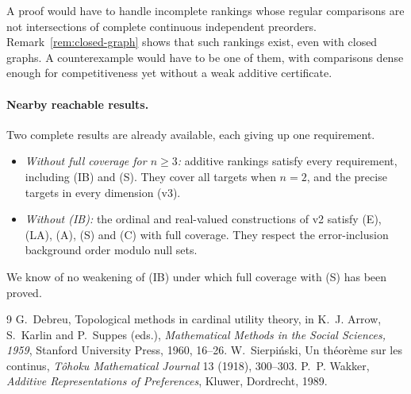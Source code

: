 \documentclass[11pt]{article}
\theoremstyle{remark}\newtheorem{remark}[theorem]{Remark}
\begin{document}
A proof would have to handle incomplete rankings whose regular comparisons
are not intersections of complete continuous independent preorders.
Remark~\ref{rem:closed-graph} shows that such rankings exist, even with closed
graphs. A counterexample would have to be one of them, with comparisons dense
enough for competitiveness yet without a weak additive certificate.

\paragraph{Nearby reachable results.} Two complete results are already
available, each giving up one requirement.
\begin{itemize}[leftmargin=*,itemsep=2pt]
\item \emph{Without full coverage for $n\ge3$:} additive rankings satisfy every
requirement, including (IB) and (S). They cover all targets when $n=2$, and
the precise targets in every dimension (v3).
\item \emph{Without (IB):} the ordinal and real-valued constructions of v2
satisfy (E), (LA), (A), (S) and (C) with full coverage. They respect the
error-inclusion background order modulo null sets.
\end{itemize}
We know of no weakening of (IB) under which full coverage with (S) has been
proved.

\begin{thebibliography}{9}
 G.~Debreu, Topological methods in cardinal utility theory,
in K.~J. Arrow, S.~Karlin and P.~Suppes (eds.), \emph{Mathematical Methods in
the Social Sciences, 1959}, Stanford University Press, 1960, 16--26.
 W.~Sierpi\'nski, Un th\'eor\`eme sur les continus,
\emph{T\^ohoku Mathematical Journal} 13 (1918), 300--303.
 P.~P. Wakker, \emph{Additive Representations of Preferences},
Kluwer, Dordrecht, 1989.
\end{thebibliography}
\end{document}
